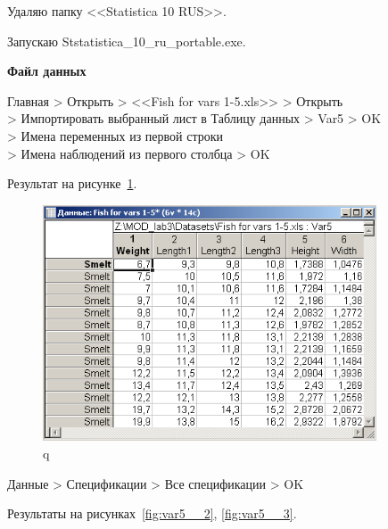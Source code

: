 Удаляю папку <<Statistica 10 RUS>>.

Запускаю Ststatistica\_10\_ru\_portable.exe.

\begin{center}
  \textbf{Файл данных}
\end{center}

Главная > Открыть > <<Fish for vars 1-5.xls>> > Открыть \\
> Импортировать выбранный лист в Таблицу данных > Var5 > OK \\
> Имена переменных из первой строки\\
> Имена наблюдений из первого столбца > OK

Результат на рисунке~\ref{fig:var5__1}.

\begin{figure}[!h]
  \centering

  \includegraphics[height=7cm]
  {inc/var5__1.PNG}

  \caption{q}

  \label{fig:var5__1}
\end{figure}

Данные > Спецификации > Все спецификации > OK 

Результаты на рисунках~\ref{fig:var5__2}, \ref{fig:var5__3}.


